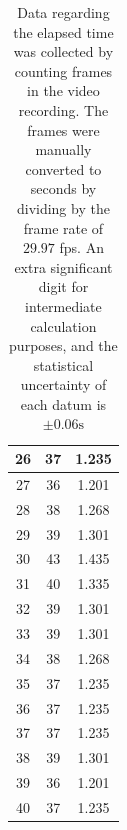 \documentclass[%
 reprint,
 amsmath,amssymb,
 aps,
]{revtex4-2}
\begin{document}
\begin{table}[h!]
\begin{tabular}{|c|c|c|}
        26	&37&	1.235 \\ \hline
        27	&36&	1.201 \\ \hline
        28	&38&	1.268 \\ \hline
        29	&39&	1.301 \\ \hline
        30	&43&	1.435 \\ \hline
        31	&40&	1.335 \\ \hline
        32	&39&	1.301 \\ \hline
        33	&39&	1.301 \\ \hline
        34	&38&	1.268 \\ \hline
        35	&37&	1.235 \\ \hline
        36	&37&	1.235 \\ \hline
        37	&37&	1.235 \\ \hline
        38	&39&	1.301 \\ \hline
        39	&36&	1.201 \\ \hline
        40	&37&	1.235 \\ \hline
        \end{tabular}
    \caption{Data regarding the elapsed time was collected by counting frames in the video recording. The frames were manually converted to seconds by dividing by the frame rate of $29.97$ fps. An extra significant digit for intermediate calculation purposes, and the statistical uncertainty of each datum is $\pm 0.06 \si{\second}$}
    \end{table}
\end{document}
